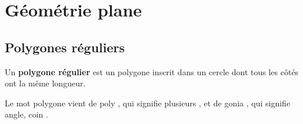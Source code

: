 \chapter{Géométrie plane}
\section{Polygones réguliers}

\begin{defin}
	Un \textbf{polygone régulier} est un polygone inscrit dans un cercle dont tous les côtés ont la même longueur.
\end{defin}

\begin{rem}
	Le mot \og{} polygone \fg{} vient de \og{} poly \fg{}, qui signifie \og{} plusieurs \fg{}, et de \og{} gonia \fg{}, qui signifie \og{} angle, coin \fg{}.
\end{rem}

